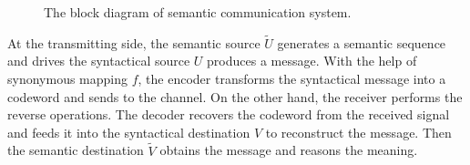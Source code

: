 \documentclass[12pt, draftclsnofoot,onecolumn]{IEEEtran}
\begin{document}
\begin{figure}[htbp]
\setlength{\abovecaptionskip}{0.cm}
\setlength{\belowcaptionskip}{-0.cm}
  \caption{The block diagram of semantic communication system.}\label{Semantic_communication_system}
\end{figure}

At the transmitting side, the semantic source $\tilde U$ generates a semantic sequence and drives the syntactical source $U$ produces a message. With the help of synonymous mapping $f$, the encoder transforms the syntactical message into a codeword and sends to the channel. On the other hand, the receiver performs the reverse operations. The decoder recovers the codeword from the received signal and feeds it into the syntactical destination $V$ to reconstruct the message. Then the semantic destination $\tilde V$ obtains the message and reasons the meaning.
\end{document}
